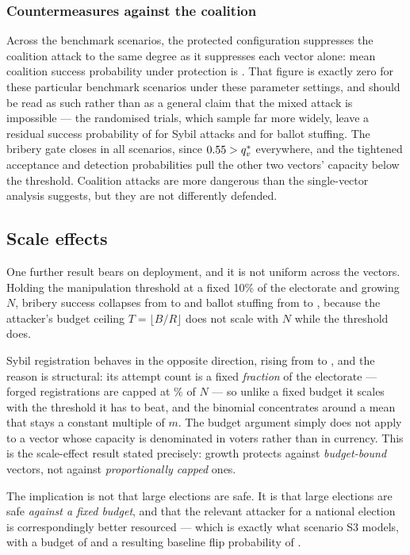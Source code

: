 \subsubsection{Countermeasures against the coalition}

Across the \CoalitionScenarioCount{} benchmark scenarios, the protected
configuration suppresses the coalition attack to the same degree as it
suppresses each vector alone: mean coalition success probability under
protection is \CoalitionMeanProtected{}. That figure is exactly zero
for these particular benchmark scenarios under these parameter
settings, and should be read as such rather than as a general claim
that the mixed attack is impossible --- the randomised trials, which
sample far more widely, leave a residual success probability of
\SybilProtected{} for Sybil attacks and \BallotStuffingProtected{} for
ballot stuffing. The bribery
gate closes in all \CoalitionScenarioCount{} scenarios, since
$0.55 > q_v^{*}$ everywhere, and the tightened acceptance and
detection probabilities pull the other two vectors' capacity below the
threshold. Coalition attacks are more dangerous than the single-vector
analysis suggests, but they are not differently defended.

\subsection{Scale effects}

One further result bears on deployment, and it is not uniform across
the vectors. Holding the manipulation threshold at a fixed 10\% of the
electorate and growing $N$, bribery success collapses from
\ScaleBriberySmall{} to \ScaleBriberyLarge{} and ballot stuffing from
\ScaleBallotSmall{} to \ScaleBallotLarge{}, because the attacker's
budget ceiling $T = \lfloor B/R \rfloor$ does not scale with $N$ while
the threshold does.

Sybil registration behaves in the opposite direction, rising from
\ScaleSybilSmall{} to \ScaleSybilLarge{}, and the reason is structural:
its attempt count is a fixed \emph{fraction} of the electorate ---
forged registrations are capped at \SybilCeilingPct\% of $N$ --- so
unlike a fixed budget it scales with the threshold it has to beat, and
the binomial concentrates around a mean that stays a constant multiple
of $m$. The budget argument simply does not apply to a vector whose
capacity is denominated in voters rather than in currency. This is the
scale-effect result stated precisely: growth protects against
\emph{budget-bound} vectors, not against \emph{proportionally
capped} ones.

The implication is not that large elections are safe. It is that large
elections are safe \emph{against a fixed budget}, and that the relevant
attacker for a national election is correspondingly better resourced
--- which is exactly what scenario S3 models, with a budget of
\SThreeBudget{} and a resulting baseline flip probability of
\SThreeExactFlip.
